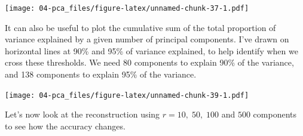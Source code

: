 \documentclass[]{book}
\newenvironment{Shaded}{\begin{snugshade}}{\end{snugshade}}
\newcommand{\DataTypeTok}[1]{\textcolor[rgb]{0.13,0.29,0.53}{#1}}
\newcommand{\DecValTok}[1]{\textcolor[rgb]{0.00,0.00,0.81}{#1}}
\newcommand{\KeywordTok}[1]{\textcolor[rgb]{0.13,0.29,0.53}{\textbf{#1}}}
\newcommand{\NormalTok}[1]{#1}
\newcommand{\OperatorTok}[1]{\textcolor[rgb]{0.81,0.36,0.00}{\textbf{#1}}}
\newcommand{\StringTok}[1]{\textcolor[rgb]{0.31,0.60,0.02}{#1}}
\theoremstyle{definition}
\theoremstyle{definition}
\theoremstyle{definition}
\theoremstyle{remark}
\begin{document}
\texttt{[image: 04-pca\_files/figure-latex/unnamed-chunk-37-1.pdf]}

It can also be useful to plot the cumulative sum of the total proportion of variance explained by a given number of principal components. I've drawn on horizontal lines at 90\% and 95\% of variance explained, to help identify when we cross these thresholds.
We need 80 components to explain 90\% of the variance, and 138 components to explain 95\% of the variance.

\begin{Shaded}
\end{Shaded}

\texttt{[image: 04-pca\_files/figure-latex/unnamed-chunk-39-1.pdf]}

Let's now look at the reconstruction using \(r=10, \;50, \;100\) and \(500\) components to see how the accuracy changes.

\begin{Shaded}
\end{Shaded}
\end{document}
